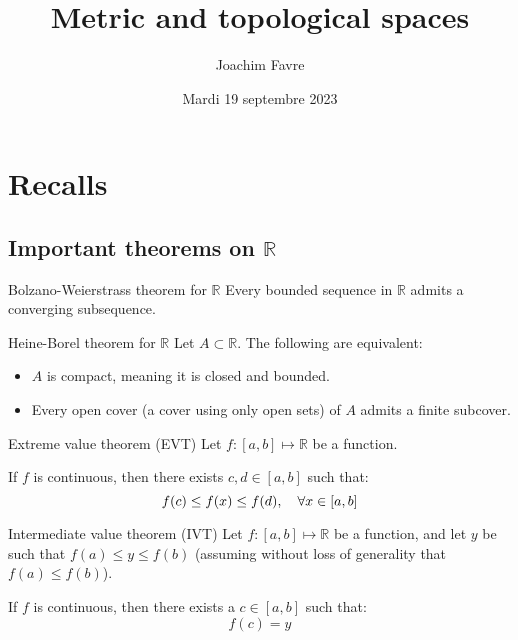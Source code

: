 \documentclass[a4paper]{article}
\title{Metric and topological spaces}
\author{Joachim Favre}
\date{Mardi 19 septembre 2023}
\begin{document}
\maketitle


\section{Recalls}

\subsection{Important theorems on $\mathbb{R}$}

\begin{parag}{Bolzano-Weierstrass theorem for $\mathbb{R}$}
    Every bounded sequence in $\mathbb{R}$ admits a converging subsequence.
\end{parag}

\begin{parag}{Heine-Borel theorem for $\mathbb{R}$}
    Let $A \subset \mathbb{R}$. The following are equivalent:
    \begin{itemize}
        \item $A$ is compact, meaning it is closed and bounded.
        \item Every open cover (a cover using only open sets) of $A$ admits a finite subcover.
    \end{itemize}
\end{parag}

\begin{parag}{Extreme value theorem (EVT)}
    Let $f: \left[a, b\right] \mapsto \mathbb{R}$ be a function.

    If $f$ is continuous, then there exists $c, d \in \left[a, b\right]$ such that:  
    \[f\left(c\right) \leq f\left(x\right) \leq f\left(d\right), \mathspace \forall x \in \left[a, b\right]\]
\end{parag}

\begin{parag}{Intermediate value theorem (IVT)}
    Let $f: \left[a, b\right] \mapsto \mathbb{R}$ be a function, and let $y$ be such that $f\left(a\right) \leq y \leq f\left(b\right)$ (assuming without loss of generality that $f\left(a\right) \leq f\left(b\right)$).

    If $f$ is continuous, then there exists a $c \in \left[a, b\right]$ such that: 
    \[f\left(c\right) = y\]
\end{parag}
\end{document}
